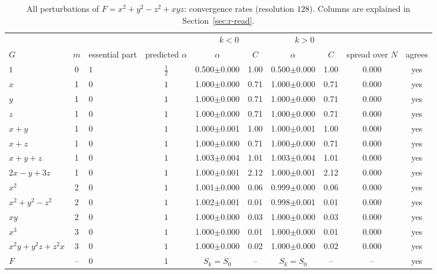 \documentclass[12pt, a4paper, oneside]{book}
\theoremstyle{plain}
\theoremstyle{definition}
\theoremstyle{remark}
\theoremstyle{definition}
\begin{document}
\begin{table}[!h]
\centering
\footnotesize
\begin{adjustbox}{max width=\textwidth}
\begin{tabular}{l c l c c c c c c c}
\toprule
& & & & \multicolumn{2}{c}{$k<0$} & \multicolumn{2}{c}{$k>0$} & & \\
\cmidrule(lr){5-6}\cmidrule(lr){7-8}
$G$ & $m$ & essential part & predicted $\alpha$ & $\alpha$ & $C$ & $\alpha$ & $C$ & spread over $N$ & agrees \\
\midrule
$1$ & 0 & $1$ & $\tfrac12$ & 0.500{\scriptsize$\pm$0.000} & 1.00 & 0.500{\scriptsize$\pm$0.000} & 1.00 & 0.000 & yes \\
$x$ & 1 & $0$ & $1$ & 1.000{\scriptsize$\pm$0.000} & 0.71 & 1.000{\scriptsize$\pm$0.000} & 0.71 & 0.000 & yes \\
$y$ & 1 & $0$ & $1$ & 1.000{\scriptsize$\pm$0.000} & 0.71 & 1.000{\scriptsize$\pm$0.000} & 0.71 & 0.000 & yes \\
$z$ & 1 & $0$ & $1$ & 1.000{\scriptsize$\pm$0.000} & 0.71 & 1.000{\scriptsize$\pm$0.000} & 0.71 & 0.000 & yes \\
$x+y$ & 1 & $0$ & $1$ & 1.000{\scriptsize$\pm$0.001} & 1.00 & 1.000{\scriptsize$\pm$0.001} & 1.00 & 0.000 & yes \\
$x+z$ & 1 & $0$ & $1$ & 1.000{\scriptsize$\pm$0.000} & 0.71 & 1.000{\scriptsize$\pm$0.000} & 0.71 & 0.000 & yes \\
$x+y+z$ & 1 & $0$ & $1$ & 1.003{\scriptsize$\pm$0.004} & 1.01 & 1.003{\scriptsize$\pm$0.004} & 1.01 & 0.000 & yes \\
$2x-y+3z$ & 1 & $0$ & $1$ & 1.000{\scriptsize$\pm$0.001} & 2.12 & 1.000{\scriptsize$\pm$0.001} & 2.12 & 0.000 & yes \\
$x^2$ & 2 & $0$ & $1$ & 1.001{\scriptsize$\pm$0.000} & 0.06 & 0.999{\scriptsize$\pm$0.000} & 0.06 & 0.000 & yes \\
$x^2+y^2-z^2$ & 2 & $0$ & $1$ & 1.002{\scriptsize$\pm$0.001} & 0.01 & 0.998{\scriptsize$\pm$0.001} & 0.01 & 0.000 & yes \\
$xy$ & 2 & $0$ & $1$ & 1.000{\scriptsize$\pm$0.000} & 0.03 & 1.000{\scriptsize$\pm$0.000} & 0.03 & 0.000 & yes \\
$x^3$ & 3 & $0$ & $1$ & 1.000{\scriptsize$\pm$0.000} & 0.01 & 1.000{\scriptsize$\pm$0.000} & 0.01 & 0.000 & yes \\
$x^2y+y^2z+z^2x$ & 3 & $0$ & $1$ & 1.000{\scriptsize$\pm$0.000} & 0.02 & 1.000{\scriptsize$\pm$0.000} & 0.02 & 0.000 & yes \\
$F$ & -- & $0$ & $1$ & $S_k=S_0$ & -- & $S_k=S_0$ & -- & -- & yes \\
\bottomrule
\end{tabular}
\end{adjustbox}
\caption[Rates for $x^2+y^2-z^2+xyz$]{All perturbations of $F=x^2+y^2-z^2+xyz$: convergence rates (resolution $128$). Columns are explained in Section~\ref{sec:r-read}.}
\label{tab:r-A1-rates}
\end{table}
\end{document}
